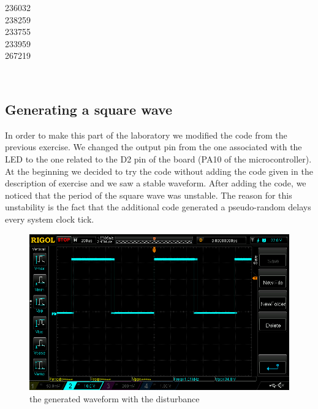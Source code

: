 \documentclass[12pt]{article}
\begin{document}
\begin{titlepage}
\begin{minipage}{0.4\textwidth}
			\begin{flushright} \large
			236032\\													%
			238259\\
            233755\\
            233959\\
            267219\\
            
		\end{flushright}
        
	\end{minipage}\\[2 cm]
	
\end{titlepage}

\newpage
\subsection{Generating a square wave}
In order to make this part of the laboratory we modified the code from the previous exercise. We changed the output pin from the one associated with the LED to the one related to the D2 pin of the board (PA10 of the microcontroller).
At the beginning we decided to try the code without adding the code given in the description of exercise and we saw a stable waveform. After adding the code, we noticed that the period of the square wave was unstable. The reason for this unstability is the fact that the additional code generated a pseudo-random delays every system clock tick.

\begin{figure}[h]
	
	\includegraphics[scale = 0.5]{NewFile1.png}
	\caption{the generated waveform with the disturbance}
\end{figure}
\end{document}
